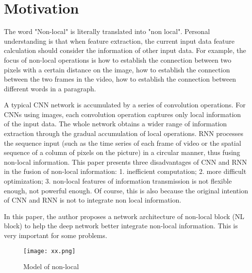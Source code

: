 \documentclass[10pt,twocolumn,letterpaper]{article}
\begin{document}
\section{Motivation}
The word "Non-local" is literally translated into "non local". Personal understanding is that when feature extraction, the current input data feature calculation should consider the information of other input data. For example, the focus of non-local operations is how to establish the connection between two pixels with a certain distance on the image, how to establish the connection between the two frames in the video\cite{name35}, how to establish the connection between different words in a paragraph.
\par A typical CNN network is accumulated by a series of convolution operations. For CNNs using images, each convolution operation captures only local information of the input data. The whole network obtains a wider range of information extraction through the gradual accumulation of local operations. RNN processes the sequence input (such as the time series of each frame of video or the spatial sequence of a column of pixels on the picture) in a circular manner, thus fusing non-local information.
This paper presents three disadvantages of CNN and RNN in the fusion of non-local information: 1. inefficient computation; 2. more difficult optimization; 3. non-local features of information transmission is not flexible enough, not powerful enough. Of course, this is also because the original intention of CNN and RNN is not to integrate non local information.
\par In this paper, the author proposes a network architecture of non-local block (NL block) to help the deep network better integrate non-local information. This is very important for some problems.
  \begin{figure}[!htb]
  	\centering
  	\texttt{[image: xx.png]}\\
  	\caption{Model of non-local}\label{Figure1}
  \end{figure}
\end{document}
